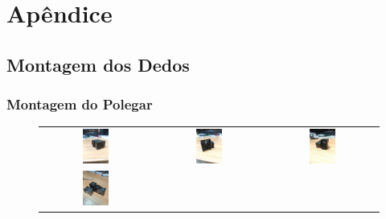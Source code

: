 \chapter{Apêndice}

\section{Montagem dos Dedos}


\subsection{Montagem do Polegar}
\begin{figure}[H]
\centering
\begin{tabular}{ccc}
  \includegraphics[width=0.25\textwidth]{figs/appendix/polegar/1.jpg} &
  \includegraphics[width=0.25\textwidth]{figs/appendix/polegar/2.jpg} &
  \includegraphics[width=0.25\textwidth]{figs/appendix/polegar/3.jpg} \\
  \includegraphics[width=0.25\textwidth]{figs/appendix/polegar/4.jpg} &

\end{tabular}
\end{figure}
